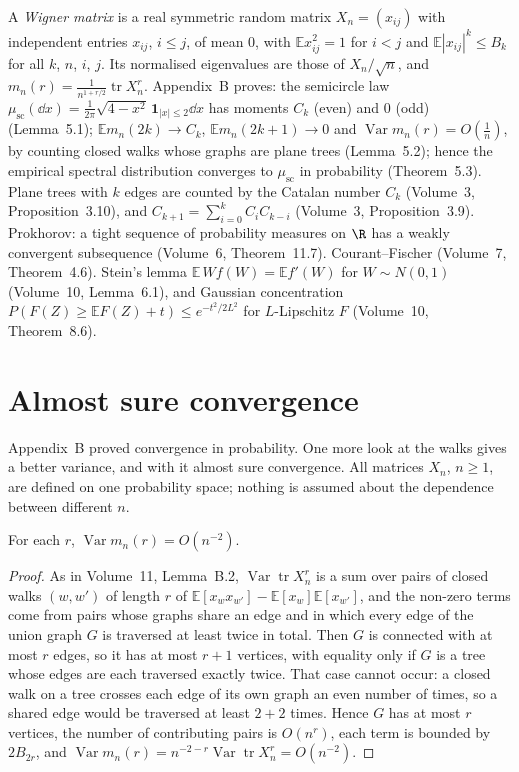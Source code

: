 \begin{reminder}
A \emph{Wigner matrix} is a real symmetric random matrix $X_n=(x_{ij})$ with independent entries $x_{ij}$, $i\le j$, of mean $0$, with $\mathbb Ex_{ij}^2=1$ for $i<j$ and $\mathbb E|x_{ij}|^k\le B_k$ for all $k$, $n$, $i$, $j$. Its
normalised eigenvalues are those of $X_n/\sqrt n$, and $m_n(r)=\frac1{n^{1+r/2}}\operatorname{tr}X_n^r$. Appendix~B proves: the semicircle law $\mu_{\mathrm{sc}}(\dd x)=\frac1{2\pi}\sqrt{4-x^2}\,\mathbf 1_{|x|\le2}\dd x$ has moments $C_k$
(even) and $0$ (odd) (Lemma~5.1); $\mathbb Em_n(2k)\to C_k$, $\mathbb Em_n(2k+1)\to0$ and $\operatorname{Var}m_n(r)=O(\frac1n)$, by counting closed walks whose graphs are plane trees (Lemma~5.2); hence the empirical spectral
distribution converges to $\mu_{\mathrm{sc}}$ in probability (Theorem~5.3). Plane trees with $k$ edges are counted by the Catalan number $C_k$ (Volume~3, Proposition~3.10), and $C_{k+1}=\sum_{i=0}^kC_iC_{k-i}$ (Volume~3,
Proposition~3.9). Prokhorov: a tight sequence of probability measures on $\R$ has a weakly convergent subsequence (Volume~6, Theorem~11.7). Courant--Fischer (Volume~7, Theorem~4.6). Stein's lemma
$\mathbb E\,Wf(W)=\mathbb Ef'(W)$ for $W\sim N(0,1)$ (Volume~10, Lemma~6.1), and Gaussian concentration $P(F(Z)\ge\mathbb EF(Z)+t)\le e^{-t^2/2L^2}$ for $L$-Lipschitz $F$ (Volume~10, Theorem~8.6).
\end{reminder}

\section{Almost sure convergence}

Appendix~B proved convergence in probability. One more look at the walks gives a better variance, and with it almost sure convergence. All matrices $X_n$, $n\ge1$, are defined on one probability space; nothing is assumed
about the dependence between different $n$.

\begin{proposition}\label{prop:varsharp}
For each $r$, $\operatorname{Var}m_n(r)=O(n^{-2})$.
\end{proposition}

\begin{proof}
As in Volume~11, Lemma~B.2, $\operatorname{Var}\operatorname{tr}X_n^r$ is a sum over pairs of closed walks $(w,w')$ of length $r$ of $\mathbb E[x_wx_{w'}]-\mathbb E[x_w]\mathbb E[x_{w'}]$, and the non-zero terms come from pairs whose graphs share an edge and
in which every edge of the union graph $G$ is traversed at least twice in total. Then $G$ is connected with at most $r$ edges, so it has at most $r+1$ vertices, with equality only if $G$ is a tree whose edges are each
traversed exactly twice. That case cannot occur: a closed walk on a tree crosses each edge of its own graph an even number of times, so a shared edge would be traversed at least $2+2$ times. Hence $G$ has at most $r$
vertices, the number of contributing pairs is $O(n^r)$, each term is bounded by $2B_{2r}$, and $\operatorname{Var}m_n(r)=n^{-2-r}\operatorname{Var}\operatorname{tr}X_n^r=O(n^{-2})$.
\end{proof}

